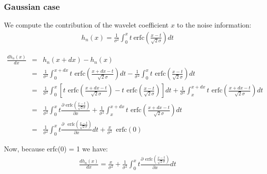\subsubsection{Gaussian case}
We compute the contribution of the wavelet coefficient $x$ to the noise information: 
\begin{eqnarray}
h_{n}(x) = 
\frac{1}{\sigma^{2}}\int_{0}^{x} t \: \mbox{erfc}
\left( \frac{x-t}{\sqrt{2}\sigma}\right) dt 
\end{eqnarray}

\begin{eqnarray}
\frac{d h_{n}(x)}{dx} &  = &  h_{n}(x+dx) - h_{n}(x)  \nonumber \\
   &  = & \frac{1}{\sigma^{2}} \int_{0}^{x+dx} 
            t \mbox{ erfc}\left(\frac{x+dx-t}{\sqrt{2}\sigma}\right) dt -
\frac{1}{\sigma^{2}}\int_{0}^{x} t \mbox{ erfc} \left(\frac{x-t}{\sqrt{2}\sigma}\right) dt \nonumber \\
   &  = & \frac{1}{\sigma^{2}} \int_{0}^{x} \left[ t 
              \mbox{ erfc}\left(\frac{x+dx-t}{\sqrt{2}\sigma}\right) 
	      - t \mbox{ erfc} \left(\frac{x-t}{\sqrt{2}\sigma}\right) \right] dt +
	   \frac{1}{\sigma^{2}} \int_{x}^{x+dx}   t 
              \mbox{ erfc}\left(\frac{x+dx-t}{\sqrt{2}\sigma}\right) dt \nonumber \\
   &  = & \frac{1}{\sigma^{2}} \int_{0}^{x} t \frac{\partial \mbox{ erfc}\left(\frac{x-t}{\sqrt{2}\sigma}\right)}{\partial x} 
          + \frac{1}{\sigma^{2}} \int_{x}^{x+dx}   t 
              \mbox{ erfc}\left(\frac{x+dx-t}{\sqrt{2}\sigma}\right) dt \nonumber \\
   &  = & \frac{1}{\sigma^{2}}\int_{0}^{x} 
          t \frac{ \partial \:  \, \mbox{ erfc} (\frac{x-t}{\sqrt{2}\sigma})}{ \partial x} dt +
	  \frac{x}{\sigma^{2}}  \, \mbox{ erfc}(0)
\end{eqnarray}


Now, because erfc(0) = 1  we have:
\begin{eqnarray}
\frac{d h_{n}(x)}{dx} = 
\frac{x}{\sigma^{2}}   +
\frac{1}{\sigma^{2}}\int_{0}^{x} 
          t \frac{ \partial \:  \, \mbox{erfc} (\frac{x-t}{\sqrt{2}\sigma})}{ \partial x} dt 
\end{eqnarray}

